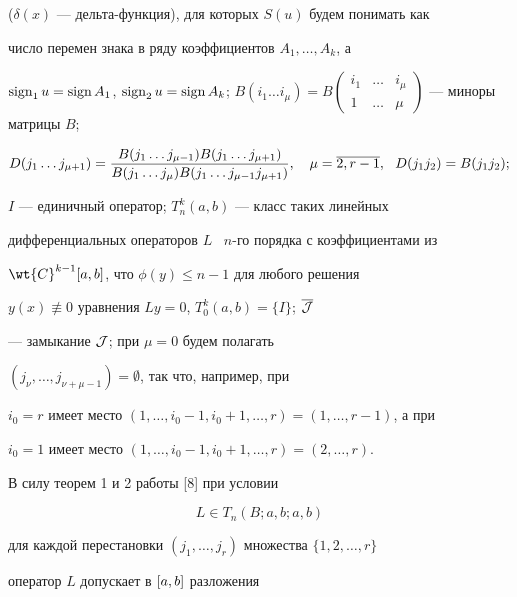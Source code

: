 ($\delta(x)$ --- дельта-функция), для которых $S(u)$ будем понимать как


число перемен знака в ряду коэффициентов $A_1,\dotsc,A_k$, а


$\sign_1{u}=\sign{A_1}$, $\sign_2{u}=\sign{A_k}$; $B(i_1\dotsc i_\mu)=


B\left(\begin{smallmatrix}i_1 & \dotsc & i_\mu \\ 1 & \dotsc & \mu


\end{smallmatrix}\right)$ --- миноры матрицы $B$;


\begin{equation}


D(j_1 \dotsc j_{\mu+1})=\mf{B(j_1 \dotsc j_{\mu-1})B(j_1 \dotsc


j_{\mu+1})}{B(j_1 \dotsc j_{\mu})B(j_1 \dotsc j_{\mu-1} j_{\mu+1})},


\quad \mu=\o{2,r-1},\ \ D(j_1 j_2)=B(j_1 j_2);


\end{equation}


$I$ --- единичный оператор; $T_n^k(a,b)$ --- класс таких линейных


дифференциальных операторов $L$ \ $n$-го порядка с коэффициентами из


$\wt{C}^{k-1}\ab$, что $\phi(y)\le n-1$ для любого решения


$y(x)\not\equiv 0$ уравнения $Ly=0$, $T_0^k(a,b)=\{I\}$; $\overline{\cal J}$


--- замыкание $\cal J$; при $\mu=0$ будем полагать


$(j_\nu,\dotsc,j_{\nu+\mu-1}){=}\emptyset$, так что, например, при


$i_0=r$ имеет место $(1, \dotsc, i_0-1,i_0+1,\dotsc,r)=(1,\dotsc,r-1)$, а при


$i_0=1$ имеет место $(1,\dotsc,i_0-1,i_0+1,\dotsc,r)=(2,\dotsc,r)$.





В силу теорем 1 и 2 работы [8] при условии


\begin{equation}


L\in T_n(B;a,b;a,b)


\end{equation}


для каждой перестановки $(j_1,\dotsc,j_r)$ множества $\{1,2,\dotsc,r\}$


оператор $L$ допускает в $[a,b]$ разложения


